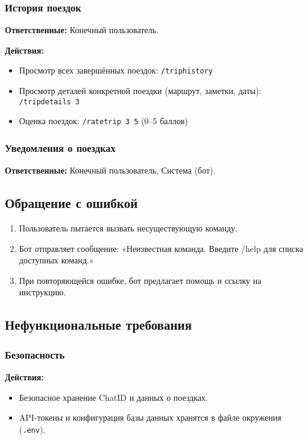 \documentclass[areasetadvanced]{scrartcl}
\begin{document}
\subsubsection{История поездок}
\textbf{Ответственные:} Конечный пользователь.

\textbf{Действия:}
\begin{itemize}
  \item Просмотр всех завершённых поездок: \texttt{/triphistory}
  \item Просмотр деталей конкретной поездки (маршрут, заметки, даты): \texttt{/tripdetails 3}
  \item Оценка поездок: \texttt{/ratetrip 3 5} (0–5 баллов)
\end{itemize}

\subsubsection{Уведомления о поездках}
\textbf{Ответственные:} Конечный пользователь, Система (бот).

\subsection{Обращение с ошибкой}
\begin{enumerate}
  \item Пользователь пытается вызвать несуществующую команду.
  \item Бот отправляет сообщение: «Неизвестная команда. Введите /help для списка доступных команд.»
  \item При повторяющейся ошибке, бот предлагает помощь и ссылку на инструкцию.
\end{enumerate}

\subsection{Нефункциональные требования}

\subsubsection{Безопасность}
\textbf{Действия:}
\begin{itemize}
  \item Безопасное хранение ChatID и данных о поездках.
  \item API-токены и конфигурация базы данных хранятся в файле окружения (\texttt{.env}).
\end{itemize}
\end{document}
